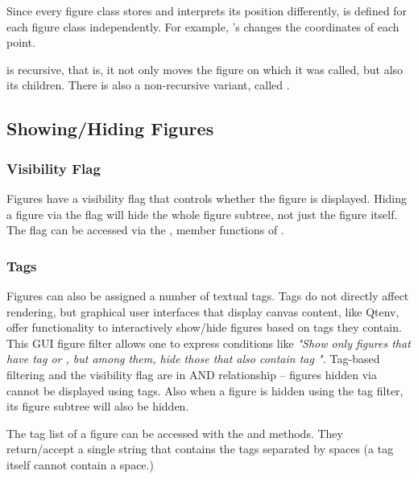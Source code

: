 Since every figure class stores and interprets its position differently,
 is defined for each figure class independently. For example,
's  changes the coordinates of each point.

 is recursive, that is, it not only moves the figure on which
it was called, but also its children. There is also a non-recursive variant,
called .


\subsection{Showing/Hiding Figures}
\label{sec:graphics:showing-hiding-figures}

\subsubsection{Visibility Flag}
\label{sec:graphics:figure-visibility-flag}

Figures have a visibility flag that controls whether the figure is
displayed. Hiding a figure via the flag will hide the whole figure subtree,
not just the figure itself. The flag can be accessed via the
,  member functions of
.

\subsubsection{Tags}
\label{sec:graphics:figure-tags}

Figures can also be assigned a number of textual tags. Tags do not directly
affect rendering, but graphical user interfaces that display canvas
content, like Qtenv, offer functionality to interactively
show/hide figures based on tags they contain. This GUI figure filter allows
one to express conditions like \textit{"Show only figures that have tag
 or , but among them, hide those that also contain
tag ".} Tag-based filtering and the visibility flag are in AND
relationship -- figures hidden via  cannot be
displayed using tags. Also when a figure is hidden using the tag filter,
its figure subtree will also be hidden.

The tag list of a figure can be accessed with the  and
  methods. They return/accept a single
string that contains the tags separated by spaces (a tag itself cannot
contain a space.)

